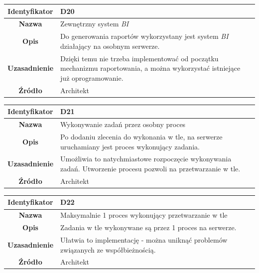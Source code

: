 \begin{table}[H]
\centering
\begin{tabular}{ | >{\bfseries}c | p{11cm} | }
\hline
%
Identyfikator & D20 \\ \hline
Nazwa & Zewnętrzny system \textit{BI} \\ \hline
Opis & Do generowania raportów wykorzystany jest system \textit{BI} działający na osobnym serwerze. \\ \hline
Uzasadnienie & Dzięki temu nie trzeba implementować od początku mechanizmu raportowania, a można wykorzystać istniejące już oprogramowanie.  \\ \hline
Źródło & Architekt \\ \hline
%
\end{tabular}
\end{table}

\begin{table}[H]
\centering
\begin{tabular}{ | >{\bfseries}c | p{11cm} | }
\hline
%
Identyfikator & D21 \\ \hline
Nazwa & Wykonywanie zadań przez osobny proces \\ \hline
Opis & Po dodaniu zlecenia do wykonania w tle, na serwerze uruchamiany jest proces wykonujący zadania. \\ \hline
Uzasadnienie & Umożliwia to natychmiastowe rozpoczęcie wykonywania zadań. Utworzenie procesu pozwoli na przetwarzanie w tle. \\ \hline
Źródło & Architekt \\ \hline
%
\end{tabular}
\end{table}

\begin{table}[H]
\centering
\begin{tabular}{ | >{\bfseries}c | p{11cm} | }
\hline
%
Identyfikator & D22 \\ \hline
Nazwa & Maksymalnie 1 proces wykonujący przetwarzanie w tle \\ \hline
Opis &  	Zadania w tle wykonywane są przez 1 proces na serwerze. \\ \hline
Uzasadnienie & Ułatwia to implementację - można uniknąć problemów związanych ze współbieżnością. \\ \hline
Źródło & Architekt \\ \hline
%
\end{tabular}
\end{table}

